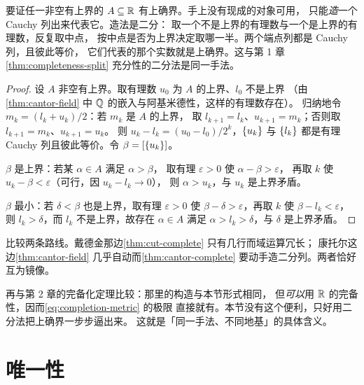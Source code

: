 \begin{strategy}
  要证任一非空有上界的 \(A \subseteq \mathbb{R}\) 有上确界。手上没有现成的对象可用，
  只能\emph{造}一个 Cauchy 列出来代表它。造法是二分：
  取一个不是上界的有理数与一个是上界的有理数，反复取中点，
  按中点是否为上界决定取哪一半。两个端点列都是 Cauchy 列，且彼此等价，
  它们代表的那个实数就是上确界。这与第 1 章%
  \cref{thm:completeness-split} 充分性的二分法是同一手法。
\end{strategy}

\begin{proof}
  设 \(A\) 非空有上界。取有理数 \(u_{0}\) 为 \(A\) 的上界、\(l_{0}\) 不是上界
  （由\cref{thm:cantor-field} 中 \(\mathbb{Q}\) 的嵌入与阿基米德性，这样的有理数存在）。
  归纳地令 \(m_{k} = (l_{k}+u_{k})/2\)：若 \(m_{k}\) 是 \(A\) 的上界，
  取 \(l_{k+1}=l_{k}\)、\(u_{k+1}=m_{k}\)；否则取 \(l_{k+1}=m_{k}\)、\(u_{k+1}=u_{k}\)。
  则 \(u_{k}-l_{k} = (u_{0}-l_{0})/2^{k}\)，\(\{u_{k}\}\) 与 \(\{l_{k}\}\)
  都是有理 Cauchy 列且彼此等价。令 \(\beta = [\{u_{k}\}]\)。

  \(\beta\) 是上界：若某 \(\alpha \in A\) 满足 \(\alpha > \beta\)，
  取有理 \(\varepsilon>0\) 使 \(\alpha - \beta > \varepsilon\)，
  再取 \(k\) 使 \(u_{k} - \beta < \varepsilon\)（可行，因 \(u_{k} - l_{k} \to 0\)），
  则 \(\alpha > u_{k}\)，与 \(u_{k}\) 是上界矛盾。

  \(\beta\) 最小：若 \(\delta < \beta\) 也是上界，取有理 \(\varepsilon>0\) 使
  \(\beta - \delta > \varepsilon\)，再取 \(k\) 使 \(\beta - l_{k} < \varepsilon\)，
  则 \(l_{k} > \delta\)，而 \(l_{k}\) 不是上界，故存在 \(\alpha \in A\) 满足
  \(\alpha > l_{k} > \delta\)，与 \(\delta\) 是上界矛盾。
\end{proof}

\begin{remark}
  比较两条路线。戴德金那边\cref{thm:cut-complete} 只有几行而域运算冗长；
  康托尔这边\cref{thm:cantor-field} 几乎自动而\cref{thm:cantor-complete}
  要动手造二分列。两者恰好互为镜像。

  再与第 2 章的完备化定理比较：那里的构造与本节形式相同，
  但\emph{可以}用 \(\mathbb{R}\) 的完备性，因而\cref{eq:completion-metric} 的极限
  直接就有。本节没有这个便利，只好用二分法把上确界一步步逼出来。
  这就是「同一手法、不同地基」的具体含义。
\end{remark}

\section{唯一性}
\label{sec:uniqueness-proof}

